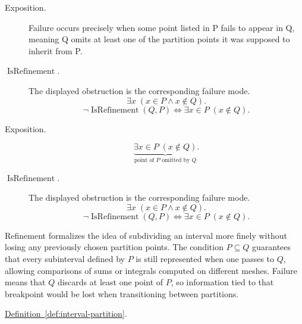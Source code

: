 \begin{remark*}
\begin{description}
  \item[Exposition.]
Failure occurs precisely when some point listed in P fails to appear in Q, meaning Q omits at least one of the partition points it was supposed to inherit from P.


  \item[\(\operatorname{IsRefinement}.\)]
  The displayed obstruction is the corresponding failure mode.
  \[
\exists x\;(x\in P \land x\notin Q).
  \]
  \[
\neg \operatorname{IsRefinement}(Q,P) \Longleftrightarrow \exists x \in P\; (x \notin Q).
  \]
\end{description}
\end{remark*}

\begin{remark*}
\begin{description}
  \item[Exposition.]
\[
\underbrace{\exists x \in P\; (x \notin Q)}_{\text{point of }P\text{ omitted by }Q}.
\]


  \item[\(\operatorname{IsRefinement}.\)]
  The displayed obstruction is the corresponding failure mode.
  \[
\exists x\;(x\in P \land x\notin Q).
  \]
  \[
\neg \operatorname{IsRefinement}(Q,P) \Longleftrightarrow \exists x \in P\; (x \notin Q).
  \]
\end{description}
\end{remark*}

\begin{remark*}[Interpretation]
Refinement formalizes the idea of subdividing an interval more finely without losing any previously chosen partition points. The condition $P \subseteq Q$ guarantees that every subinterval defined by $P$ is still represented when one passes to $Q$, allowing comparisons of sums or integrals computed on different meshes. Failure means that $Q$ discards at least one point of $P$, so information tied to that breakpoint would be lost when transitioning between partitions.
\end{remark*}

\begin{dependencies}
\hyperref[def:interval-partition]{Definition~\ref*{def:interval-partition}}.
\end{dependencies}



